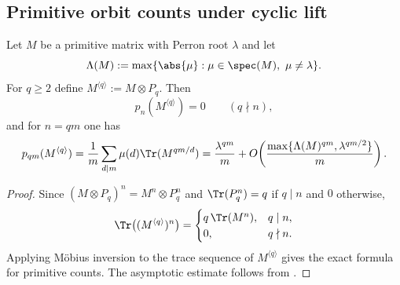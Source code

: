 \subsection{Primitive orbit counts under cyclic lift}

\begin{proposition}
  \label{prop:cyclic-lift-primitive-asymptotics}
  Let $M$ be a primitive matrix with Perron root $\lambda$ and let
  \[
    \Lambda(M):=\max\{\abs{\mu}:\mu\in\spec(M),\ \mu\neq\lambda\}.
  \]
  For $q\ge 2$ define $M^{\langle q\rangle}:=M\otimes P_q$. Then
  \[
    p_n(M^{\langle q\rangle})=0
    \qquad (q\nmid n),
  \]
  and for $n=qm$ one has
  \[
    p_{qm}(M^{\langle q\rangle})
    =\frac{1}{m}\sum_{d\mid m}\mu(d)\Tr(M^{qm/d})
    =\frac{\lambda^{qm}}{m}
      +O\!\left(
        \frac{\max\{\Lambda(M)^{qm},\lambda^{qm/2}\}}{m}
      \right).
  \]
\end{proposition}

\begin{proof}
  Since $(M\otimes P_q)^n=M^n\otimes P_q^n$ and
  $\Tr(P_q^n)=q$ if $q\mid n$ and $0$ otherwise,
  \[
    \Tr\bigl((M^{\langle q\rangle})^n\bigr)
    =
    \begin{cases}
      q\,\Tr(M^n), & q\mid n,\\
      0, & q\nmid n.
    \end{cases}
  \]
  Applying Möbius inversion to the trace sequence of
  $M^{\langle q\rangle}$ gives the exact formula for primitive counts.
  The asymptotic estimate follows from
  .
\end{proof}
